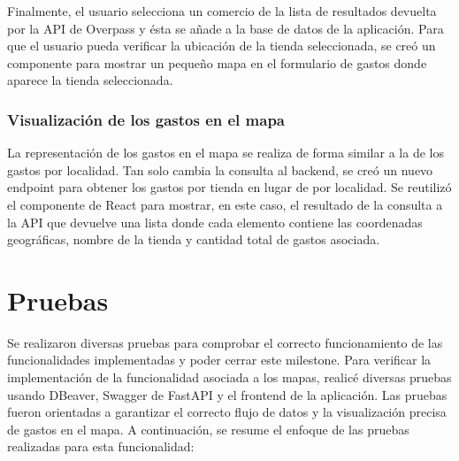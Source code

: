 Finalmente, el usuario selecciona un comercio de la lista de resultados devuelta por la API de Overpass y ésta se añade a la base de datos de la aplicación. Para que el usuario pueda verificar la ubicación de la tienda seleccionada, se creó un componente para mostrar un pequeño mapa en el formulario de gastos donde aparece la tienda seleccionada.

\subsubsection{Visualización de los gastos en el mapa}
La representación de los gastos en el mapa se realiza de forma similar a la de los gastos por localidad. Tan solo cambia la consulta al backend, se creó un nuevo endpoint para obtener los gastos por tienda en lugar de por localidad. Se reutilizó el componente de React para mostrar, en este caso, el resultado de la consulta a la API que devuelve una lista donde cada elemento contiene las coordenadas geográficas, nombre de la tienda y cantidad total de gastos asociada.

\section{Pruebas}
Se realizaron diversas pruebas para comprobar el correcto funcionamiento de las funcionalidades implementadas y poder cerrar este milestone. 
Para verificar la implementación de la funcionalidad asociada a los mapas, realicé diversas pruebas usando DBeaver, Swagger de FastAPI y el frontend de la aplicación. Las pruebas fueron orientadas a garantizar el correcto flujo de datos y la visualización precisa de gastos en el mapa. A continuación, se resume el enfoque de las pruebas realizadas para esta funcionalidad:

